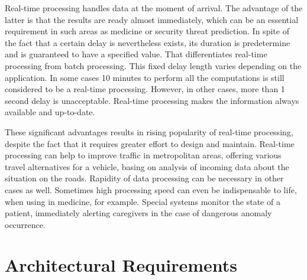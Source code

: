 Real-time processing handles data at the moment of arrival. 
The advantage of the latter is that the results are ready almost immediately, which can be an essential requirement in such areas as medicine or security threat prediction. 
In spite of the fact that a certain delay is nevertheless exists, its duration is predetermine and is guaranteed to have a specified value.
That differentiates real-time processing from batch processing.
This fixed delay length varies depending on the application.
In some cases 10 minutes to perform all the computations is still considered to be a real-time processing.
However, in other cases, more than 1 second delay is unacceptable.
Real-time processing makes the information always available and up-to-date.

These significant advantages results in rising popularity of real-time processing, despite the fact that it requires greater effort to design and maintain.
Real-time processing can help to improve traffic in metropolitan areas, offering various travel alternatives for a vehicle, basing on analysis of incoming data about the situation on the roads.
Rapidity of data processing can be necessary in other cases as well.
Sometimes high processing speed can even be indispensable to life, when using in medicine, for example.
Special systems monitor the state of a patient, immediately alerting caregivers in the case of dangerous anomaly occurrence. 

\section{Architectural Requirements}



